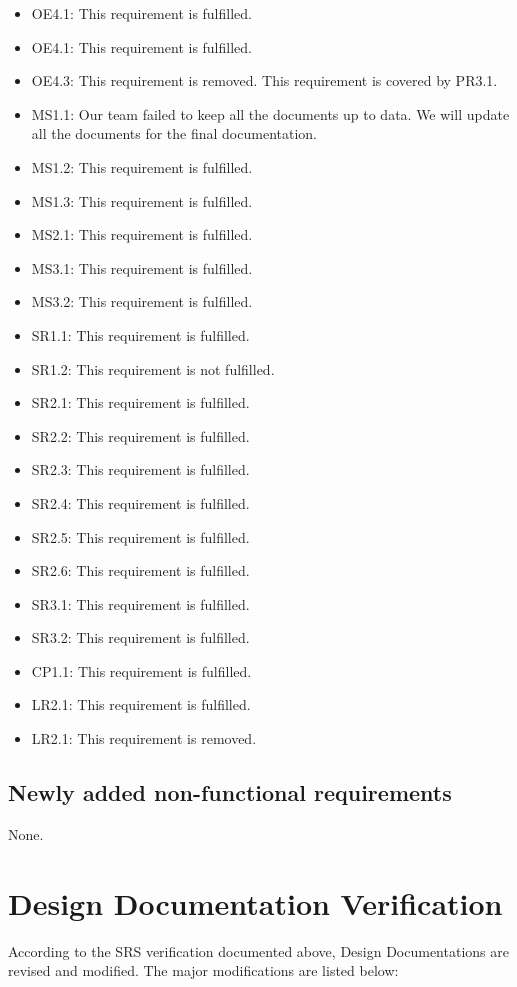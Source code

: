 \documentclass[12pt, titlepage]{article}
\begin{document}
\begin{itemize}
\item OE4.1: This requirement is fulfilled.
\item OE4.1: This requirement is fulfilled.
\item OE4.3: This requirement is removed.  This requirement is covered by PR3.1.
\item MS1.1: Our team failed to keep all the documents up to data. We will update
all the documents for the final documentation.
\item MS1.2: This requirement is fulfilled.
\item MS1.3: This requirement is fulfilled.
\item MS2.1: This requirement is fulfilled.
\item MS3.1: This requirement is fulfilled.
\item MS3.2: This requirement is fulfilled.
\item SR1.1: This requirement is fulfilled.
\item SR1.2: This requirement is not fulfilled.
\item SR2.1: This requirement is fulfilled.
\item SR2.2: This requirement is fulfilled.
\item SR2.3: This requirement is fulfilled.
\item SR2.4: This requirement is fulfilled.
\item SR2.5: This requirement is fulfilled.
\item SR2.6: This requirement is fulfilled.
\item SR3.1: This requirement is fulfilled.
\item SR3.2: This requirement is fulfilled.
\item CP1.1: This requirement is fulfilled.
\item LR2.1: This requirement is fulfilled.
\item LR2.1: This requirement is removed.
\end{itemize}
\subsection{Newly added non-functional requirements}
None.


\section{Design Documentation Verification}
According to the SRS verification documented above, Design Documentations are revised and modified. The major modifications are listed below:
\end{document}

